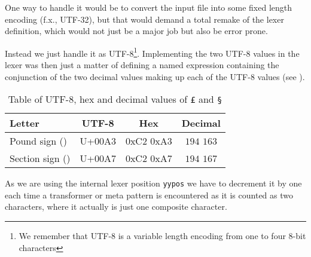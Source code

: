 One way to handle it would be to convert the input file into some fixed length
encoding (f.x., UTF-32), but that would demand a total remake of the lexer
definition, which would not just be a major job but also be error prone.

Instead we just handle it as UTF-8\footnote{We remember that UTF-8 is a variable
  length encoding from one to four 8-bit characters}. Implementing the two
UTF-8 values in the lexer was then just a matter of defining a named expression
containing the conjunction of the two decimal values making up each of the UTF-8
values (see ).

\begin{table}
  \centering
  \begin{tabular}{|l|c|c|c|}
    \hline
    \textbf{Letter} & \textbf{UTF-8} & \textbf{Hex} & \textbf{Decimal} \\ \hline
    Pound sign (\ttt{£})   & U+00A3 & 0xC2 0xA3 &  $194$ $163$ \\ \hline
    Section sign (\ttt{§}) & U+00A7 & 0xC2 0xA7 & $194$ $167$ \\ \hline
  \end{tabular}

  \caption{Table of UTF-8, hex and decimal values of \texttt{£} and \texttt{§}}
  \label{tab:utf8-rule-values}
\end{table}

As we are using the internal lexer position \texttt{yypos} we have to decrement
it by one each time a transformer or meta pattern is encountered as it is
counted as two characters, where it actually is just one composite character.



